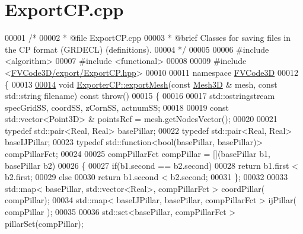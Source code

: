 \hypertarget{ExportCP_8cpp_source}{}\section{Export\+C\+P.\+cpp}
\label{ExportCP_8cpp_source}

\begin{DoxyCode}
00001 \textcolor{comment}{/*}
00002 \textcolor{comment}{ * @file ExportCP.cpp}
00003 \textcolor{comment}{ * @brief Classes for saving files in the CP format (GRDECL) (definitions).}
00004 \textcolor{comment}{ */}
00005 
00006 \textcolor{preprocessor}{#include <algorithm>}
00007 \textcolor{preprocessor}{#include <functional>}
00008 
00009 \textcolor{preprocessor}{#include <\hyperlink{ExportCP_8hpp}{FVCode3D/export/ExportCP.hpp}>}
00010 
00011 \textcolor{keyword}{namespace }\hyperlink{namespaceFVCode3D}{FVCode3D}
00012 \{
00013 
\hypertarget{ExportCP_8cpp_source.tex_l00014}{}\hyperlink{classFVCode3D_1_1ExporterCP_a710defb3e6ef55d69fea4833920b755b}{00014} \textcolor{keywordtype}{void} \hyperlink{classFVCode3D_1_1ExporterCP_a710defb3e6ef55d69fea4833920b755b}{ExporterCP::exportMesh}(\textcolor{keyword}{const} \hyperlink{classFVCode3D_1_1Mesh3D}{Mesh3D} & mesh, \textcolor{keyword}{const} std::string filename) \textcolor{keyword}{
      const} \textcolor{keywordflow}{throw}()
00015 \{
00016 
00017     std::ostringstream specGridSS, coordSS, zCornSS, actnumSS;
00018 
00019     \textcolor{keyword}{const} std::vector<Point3D> & pointsRef = mesh.getNodesVector();
00020 
00021     \textcolor{keyword}{typedef} std::pair<Real, Real> basePillar;
00022     \textcolor{keyword}{typedef} std::pair<Real, Real> baseIJPillar;
00023     \textcolor{keyword}{typedef} std::function<bool(basePillar, basePillar)> compPillarFct;
00024 
00025     compPillarFct compPillar = [](basePillar b1, basePillar b2)
00026     \{
00027         \textcolor{keywordflow}{if}(b1.second == b2.second)
00028             \textcolor{keywordflow}{return} b1.first < b2.first;
00029         \textcolor{keywordflow}{else}
00030             \textcolor{keywordflow}{return} b1.second < b2.second;
00031     \};
00032 
00033     std::map< basePillar, std::vector<Real>, compPillarFct > coordPillar( compPillar);
00034     std::map< baseIJPillar, basePillar, compPillarFct > ijPillar( compPillar );
00035 
00036     std::set<basePillar, compPillarFct > pillarSet(compPillar);

\end{DoxyCode}
